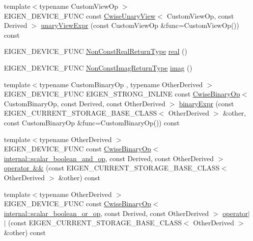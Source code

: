 \begin{DoxyCompactItemize}
{\footnotesize template$<$typename Custom\+View\+Op $>$ }\\E\+I\+G\+E\+N\+\_\+\+D\+E\+V\+I\+C\+E\+\_\+\+F\+U\+NC const \mbox{\hyperlink{class_eigen_1_1_cwise_unary_view}{Cwise\+Unary\+View}}$<$ Custom\+View\+Op, const Derived $>$ \mbox{\hyperlink{class_eigen_1_1_matrix_base_a302dec31d512edd5781f059c08e3179c}{unary\+View\+Expr}} (const Custom\+View\+Op \&func=Custom\+View\+Op()) const
\item 
E\+I\+G\+E\+N\+\_\+\+D\+E\+V\+I\+C\+E\+\_\+\+F\+U\+NC \mbox{\hyperlink{struct_eigen_1_1internal_1_1true__type}{Non\+Const\+Real\+Return\+Type}} \mbox{\hyperlink{class_eigen_1_1_matrix_base_a1738254da7bde8e46bb50b47a60adff0}{real}} ()
\item 
E\+I\+G\+E\+N\+\_\+\+D\+E\+V\+I\+C\+E\+\_\+\+F\+U\+NC \mbox{\hyperlink{class_eigen_1_1_cwise_unary_view}{Non\+Const\+Imag\+Return\+Type}} \mbox{\hyperlink{class_eigen_1_1_matrix_base_aa60c37d8bb4139f7254d4fb9e2cebb68}{imag}} ()
\item 
{\footnotesize template$<$typename Custom\+Binary\+Op , typename Other\+Derived $>$ }\\E\+I\+G\+E\+N\+\_\+\+D\+E\+V\+I\+C\+E\+\_\+\+F\+U\+NC E\+I\+G\+E\+N\+\_\+\+S\+T\+R\+O\+N\+G\+\_\+\+I\+N\+L\+I\+NE const \mbox{\hyperlink{class_eigen_1_1_cwise_binary_op}{Cwise\+Binary\+Op}}$<$ Custom\+Binary\+Op, const Derived, const Other\+Derived $>$ \mbox{\hyperlink{class_eigen_1_1_matrix_base_a62e662227f0ef8ce077a44a46510507d}{binary\+Expr}} (const E\+I\+G\+E\+N\+\_\+\+C\+U\+R\+R\+E\+N\+T\+\_\+\+S\+T\+O\+R\+A\+G\+E\+\_\+\+B\+A\+S\+E\+\_\+\+C\+L\+A\+SS$<$ Other\+Derived $>$ \&other, const Custom\+Binary\+Op \&func=Custom\+Binary\+Op()) const
\item 
{\footnotesize template$<$typename Other\+Derived $>$ }\\E\+I\+G\+E\+N\+\_\+\+D\+E\+V\+I\+C\+E\+\_\+\+F\+U\+NC const \mbox{\hyperlink{class_eigen_1_1_cwise_binary_op}{Cwise\+Binary\+Op}}$<$ \mbox{\hyperlink{struct_eigen_1_1internal_1_1scalar__boolean__and__op}{internal\+::scalar\+\_\+boolean\+\_\+and\+\_\+op}}, const Derived, const Other\+Derived $>$ \mbox{\hyperlink{class_eigen_1_1_matrix_base_ac627838c5639468b08f77733c88acdcb}{operator \&\&}} (const E\+I\+G\+E\+N\+\_\+\+C\+U\+R\+R\+E\+N\+T\+\_\+\+S\+T\+O\+R\+A\+G\+E\+\_\+\+B\+A\+S\+E\+\_\+\+C\+L\+A\+SS$<$ Other\+Derived $>$ \&other) const
\item 
{\footnotesize template$<$typename Other\+Derived $>$ }\\E\+I\+G\+E\+N\+\_\+\+D\+E\+V\+I\+C\+E\+\_\+\+F\+U\+NC const \mbox{\hyperlink{class_eigen_1_1_cwise_binary_op}{Cwise\+Binary\+Op}}$<$ \mbox{\hyperlink{struct_eigen_1_1internal_1_1scalar__boolean__or__op}{internal\+::scalar\+\_\+boolean\+\_\+or\+\_\+op}}, const Derived, const Other\+Derived $>$ \mbox{\hyperlink{class_eigen_1_1_matrix_base_aa93be3d50d662b7bb54bfd346e480675}{operator$\vert$$\vert$}} (const E\+I\+G\+E\+N\+\_\+\+C\+U\+R\+R\+E\+N\+T\+\_\+\+S\+T\+O\+R\+A\+G\+E\+\_\+\+B\+A\+S\+E\+\_\+\+C\+L\+A\+SS$<$ Other\+Derived $>$ \&other) const

\end{DoxyCompactItemize}
